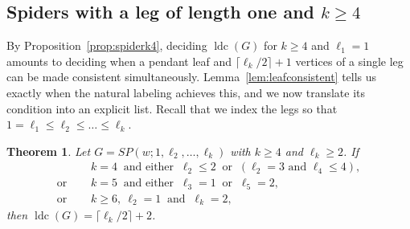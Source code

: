 \documentclass[reqno,10pt]{article}
\newtheorem{theorem}{Theorem}
\theoremstyle{definition}
\numberwithin{equation}{section}
\numberwithin{theorem}{section}
\newcommand{\ldc}{\operatorname{ldc}}
\begin{document}
\subsection{Spiders with a leg of length one and \texorpdfstring{$k\ge4$}{k>=4}}
\label{sec:spexc}

By Proposition~\ref{prop:spiderk4}, deciding $\ldc(G)$ for $k\ge4$ and
$\ell_1=1$ amounts to deciding when a pendant leaf and
$\lceil \ell_k/2\rceil+1$ vertices of a single leg can be made consistent
simultaneously. Lemma~\ref{lem:leafconsistent} tells us exactly when the
natural labeling achieves this, and we now translate its condition into an
explicit list. Recall that we index the legs so that
$1=\ell_1\le\ell_2\le\dots\le\ell_k$.

\begin{theorem}
\label{thm:spiderexc}
Let $G=SP(w;1,\ell_2,\dots,\ell_k)$ with $k\ge4$ and $\ell_k\ge2$. If
\begin{equation}
\begin{aligned}
  &k=4 \ \text{ and either } \ \ell_2\le2 \ \text{ or } \ (\ell_2=3
     \text{ and } \ell_4\le4),\\
  \text{or }\quad
  &k=5 \ \text{ and either } \ \ell_3=1 \ \text{ or } \ \ell_5=2,\\
  \text{or }\quad
  &k\ge6, \ \ell_2=1 \ \text{ and } \ \ell_k=2,
\end{aligned}
  \label{eq:exclist}
\end{equation}
then $\ldc(G)=\lceil \ell_k/2\rceil+2$.
\end{theorem}
\end{document}
